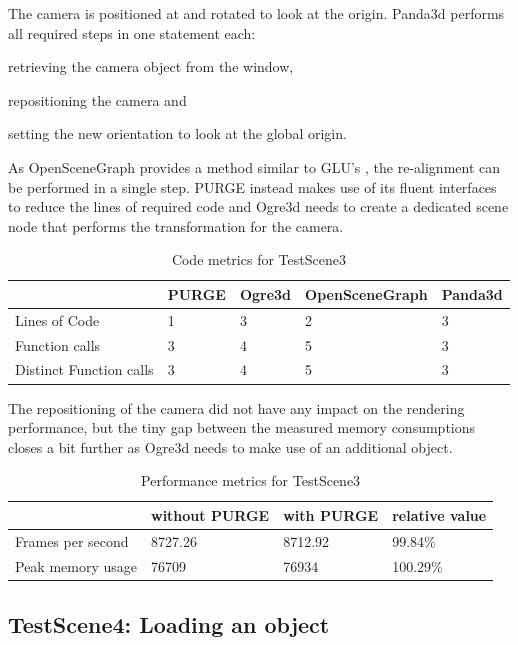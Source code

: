 	The camera is positioned at  and rotated to look at the origin. Panda3d performs all required steps in one statement each:

	\begin{numlist}
		\item retrieving the camera object from the window,
		\item repositioning the camera and
		\item setting the new orientation to look at the global origin.
	\end{numlist}
	
	As OpenSceneGraph provides a method similar to GLU's , the re-alignment can be performed in a single step. PURGE instead makes use of its fluent interfaces to reduce the lines of required code and Ogre3d needs to create a dedicated scene node that performs the transformation for the camera.

	\begin{table}[htpb]
		\center
		\caption{Code metrics for TestScene3}
		\begin{tabular}{l | l | l | l | l}
			& PURGE & Ogre3d & OpenSceneGraph & Panda3d\\ \hline
			Lines of Code & 1 & 3 & 2 & 3\\
			Function calls & 3 & 4 & 5 & 3\\
			Distinct Function calls & 3 & 4 & 5 & 3\\
		\end{tabular}
		\label{tbl:Code3}
	\end{table}

	The repositioning of the camera did not have any impact on the rendering performance, but the tiny gap between the measured memory consumptions closes a bit further as Ogre3d needs to make use of an additional object.

	\begin{table}[htpb]
		\center
		\caption{Performance metrics for TestScene3}
		\begin{tabular}{l | l | l | l}
			& without PURGE & with PURGE & relative value\\ \hline
			Frames per second & 8727.26 & 8712.92 & 99.84\%\\
			Peak memory usage & 76709 & 76934 & 100.29\%\\
		\end{tabular}
		\label{tbl:Performance3}
	\end{table}

\subsection{TestScene4: Loading an object}

